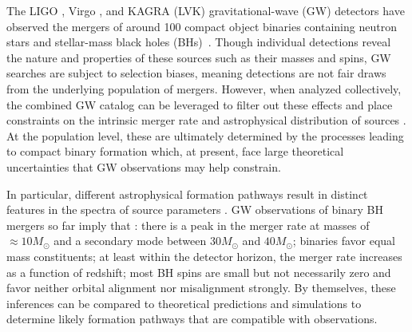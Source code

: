 \begin{refsection}
The LIGO \cite{LIGOScientific:2014pky}, Virgo \cite{VIRGO:2014yos}, and KAGRA \cite{KAGRA:2020tym} (LVK) gravitational-wave (GW) detectors have observed the mergers of around 100 compact object binaries containing neutron stars and stellar-mass black holes (BHs)~\cite{LIGOScientific:2018mvr,LIGOScientific:2020ibl,LIGOScientific:2021usb,KAGRA:2021vkt}. Though individual detections reveal the nature and properties of these sources such as their masses and spins, GW searches are subject to selection biases, meaning detections are not fair draws from the underlying population of mergers. However, when analyzed collectively, the combined GW catalog can be leveraged to filter out these effects and place constraints on the intrinsic merger rate and astrophysical distribution of sources \cite{Mandel:2018mve, Thrane:2018qnx, Vitale2020, Essick:2023upv}. At the population level, these are ultimately determined by the processes leading to compact binary formation which, at present, face large theoretical uncertainties that GW observations may help constrain.

In particular, different astrophysical formation pathways result in distinct features in the spectra of source parameters \cite{Mandel:2018hfr, Mandel:2021smh, Mapelli:2021taw, Bavera:2020uch, Bavera:2022mef, Zevin:2020gbd, Zevin:2022wrw, Broekgaarden:2022nst, Fuller:2019sxi, Bavera:2020inc, Fuller:2022ysb, Barkat:1967zz, Woosley:2016hmi, Tanikawa:2021zfm, Gerosa:2021mno}. GW observations of binary BH mergers so far imply that \cite{LIGOScientific:2018jsj, LIGOScientific:2020kqk, KAGRA:2021duu}: there is a peak in the merger rate at masses of $\approx10M_\odot$ and a secondary mode between $30M_\odot$ and $40M_\odot$; binaries favor equal mass constituents; at least within the detector horizon, the merger rate increases as a function of redshift; most BH spins are small but not necessarily zero and favor neither orbital alignment nor misalignment strongly. By themselves, these inferences can be compared to theoretical predictions and simulations to determine likely formation pathways that are compatible with observations.


\end{refsection}
